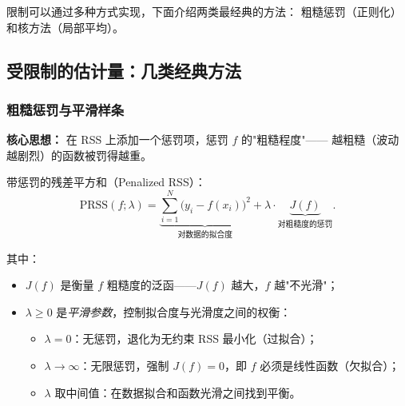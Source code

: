 限制可以通过多种方式实现，下面介绍两类最经典的方法：
粗糙惩罚（正则化）和核方法（局部平均）。

\subsection{受限制的估计量：几类经典方法}

\subsubsection{粗糙惩罚与平滑样条}

\textbf{核心思想：} 在 RSS 上添加一个惩罚项，惩罚 $f$ 的"粗糙程度"——
越粗糙（波动越剧烈）的函数被罚得越重。

带惩罚的残差平方和（Penalized RSS）：
\begin{equation}\label{eq:prss}
    \mathrm{PRSS}(f; \lambda) = \underbrace{\sum_{i=1}^{N} \big(y_i - f(x_i)\big)^2}_{\text{对数据的拟合度}}
                              + \lambda \cdot \underbrace{J(f)}_{\text{对粗糙度的惩罚}}.
\end{equation}

其中：
\begin{itemize}
    \item $J(f)$ 是衡量 $f$ 粗糙度的泛函——$J(f)$ 越大，$f$ 越"不光滑"；
    \item $\lambda \ge 0$ 是\emph{平滑参数}，控制拟合度与光滑度之间的权衡：
    \begin{itemize}
        \item $\lambda = 0$：无惩罚，退化为无约束 RSS 最小化（过拟合）；
        \item $\lambda \to \infty$：无限惩罚，强制 $J(f)=0$，即 $f$ 必须是线性函数（欠拟合）；
        \item $\lambda$ 取中间值：在数据拟合和函数光滑之间找到平衡。
    \end{itemize}
\end{itemize}

